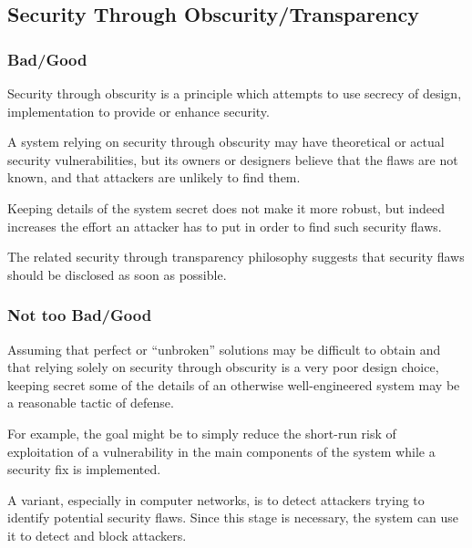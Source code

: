 
\subsection{Security Through Obscurity/Transparency}


\begin{frame}
  \frametitle{Bad/Good}

  Security through obscurity is a principle which attempts to use secrecy of
  design, implementation \etc{} to provide or enhance security.

  \-

  A system relying on security through obscurity may have theoretical or
  actual security vulnerabilities, but its owners or designers believe that
  the flaws are not known, and that attackers are unlikely to find them.

  \-

  Keeping details of the system secret does not make it more robust, but
  indeed increases the effort an attacker has to put in order to find such
  security flaws.

  \-

  The related security through transparency philosophy suggests that security
  flaws should be disclosed as soon as possible.
\end{frame}


\begin{frame}
  \frametitle{Not too Bad/Good}

  Assuming that perfect or ``unbroken'' solutions may be difficult to obtain
  and that relying solely on security through obscurity is a very poor design
  choice, keeping secret some of the details of an otherwise well-engineered
  system may be a reasonable tactic of defense.

  \-

  For example, the goal might be to simply reduce the short-run risk of
  exploitation of a vulnerability in the main components of the system while
  a security fix is implemented.

  \-

  A variant, especially in computer networks, is to detect attackers trying
  to identify potential security flaws. Since this stage is necessary, the
  system can use it to detect and block attackers.
\end{frame}

